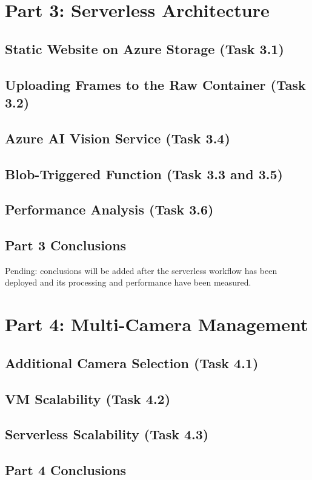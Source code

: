 \documentclass{article}
\begin{document}
\section{Part 3: Serverless Architecture}
    \subsection{Static Website on Azure Storage (Task 3.1)}
    \subsection{Uploading Frames to the Raw Container (Task 3.2)}
    \subsection{Azure AI Vision Service (Task 3.4)}
    \subsection{Blob-Triggered Function (Task 3.3 and 3.5)}
    \subsection{Performance Analysis (Task 3.6)}
    \subsection{Part 3 Conclusions}

    Pending: conclusions will be added after the serverless workflow has been deployed and its processing and performance have been measured.

\section{Part 4: Multi-Camera Management}
    \subsection{Additional Camera Selection (Task 4.1)}
    \subsection{VM Scalability (Task 4.2)}
    \subsection{Serverless Scalability (Task 4.3)}
    \subsection{Part 4 Conclusions}
\end{document}
